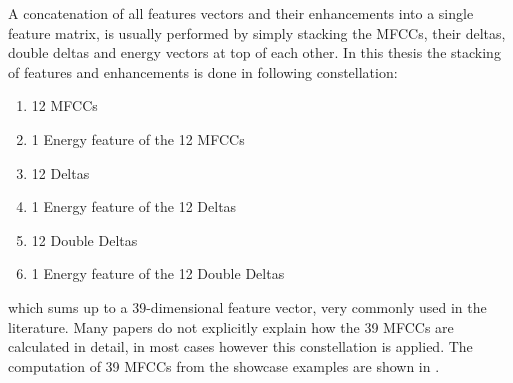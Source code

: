 A concatenation of all features vectors and their enhancements into a single feature matrix, is usually performed by simply stacking the MFCCs, their deltas, double deltas and energy vectors at top of each other.
In this thesis the stacking of features and enhancements is done in following constellation:
\begin{enumerate}
    \item 12 MFCCs
    \item 1 Energy feature of the 12 MFCCs
    \item 12 Deltas
    \item 1 Energy feature of the 12 Deltas
    \item 12 Double Deltas
    \item 1 Energy feature of the 12 Double Deltas
\end{enumerate}
which sums up to a 39-dimensional feature vector, very commonly used in the literature.
Many papers do not explicitly explain how the 39 MFCCs are calculated in detail, in most cases however this constellation is applied.
The computation of 39 MFCCs from the showcase examples are shown in .

